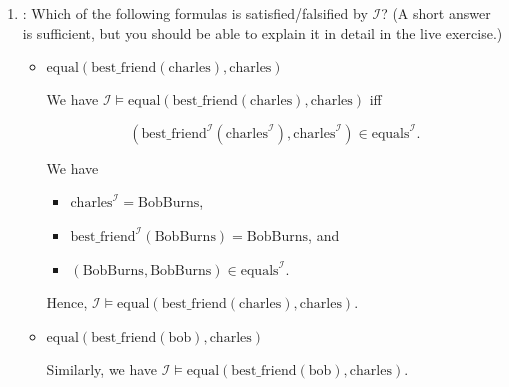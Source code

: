 \documentclass{acAssignment}
\begin{document}
\vspace{0.4cm}
\begin{enumerate}
    \item {}:
        Which of the following formulas is satisfied/falsified by $\mathcal{I}$?
        (A short answer is sufficient, but you should be able to explain it in detail in the live exercise.)
        
        \begin{itemize}
            \item $\mathrm{equal}(\mathrm{best\_friend}(\mathrm{charles}), \mathrm{charles})$
            
                \begin{acSolution}
                    We have $\mathcal{I} \models \mathrm{equal}(\mathrm{best\_friend}(\mathrm{charles}), \mathrm{charles})$ iff
                    
                    \begin{equation}
                        (\mathrm{best\_friend}^\mathcal{I}(\mathrm{charles}^\mathcal{I}), \mathrm{charles}^\mathcal{I}) \in \mathrm{equals}^\mathcal{I}.
                    \end{equation}
                    
                    We have
                    
                    \begin{itemize}
                        \item $\mathrm{charles}^\mathcal{I} = \mathrm{BobBurns}$,
                        \item $\mathrm{best\_friend}^\mathcal{I}(\mathrm{BobBurns}) = \mathrm{BobBurns}$, and
                        \item $(\mathrm{BobBurns}, \mathrm{BobBurns}) \in \mathrm{equals}^\mathcal{I}$.
                    \end{itemize}
                    
                    Hence, $\mathcal{I} \models \mathrm{equal}(\mathrm{best\_friend}(\mathrm{charles}), \mathrm{charles})$.
                \end{acSolution}
            \item $\mathrm{equal}(\mathrm{best\_friend}(\mathrm{bob}), \mathrm{charles})$
            
                \begin{acSolution}
                    Similarly, we have $\mathcal{I} \models \mathrm{equal}(\mathrm{best\_friend}(\mathrm{bob}), \mathrm{charles})$.
                \end{acSolution}
            

\end{itemize}
\end{enumerate}
\end{document}
